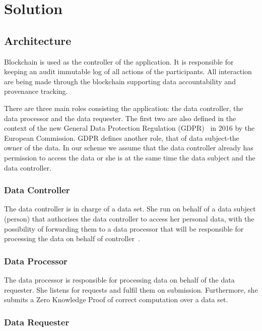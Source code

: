 \chapter{Solution}
\label{solution}

\section{Architecture}

Blockchain is used as the controller of the application. It is responsible for keeping an
audit immutable log of all actions of the participants. All interaction are being made
through the blockchain supporting data accountability and provenance tracking.

There are three main roles consisting the application: the data controller, the data processor
and the data requester. The first two are also defined in the context of the new
General Data Protection Regulation (GDPR)~\cite{gdpr} in 2016 by the European Commission.
GDPR defines another role, that of data subject-the owner of the data.
In our scheme we assume that the data controller already has permission to access the data or
she is at the same time the data subject and the data controller.

\subsection{Data Controller}

The data controller is in charge of a data set. She run on behalf of a data subject (person)
that authorises the data controller to access her personal data, with the possibility of forwarding
them to a data processor that will be responsible for processing the data on behalf of controller~\cite{DBLP:journals/corr/NeisseSF17}.

\subsection{Data Processor}

The data processor is responsible for processing data on behalf of the data requester. She listens
for requests and fulfil them on submission. Furthermore, she submits a Zero Knowledge Proof of correct computation over
a data set.

\subsection{Data Requester}

